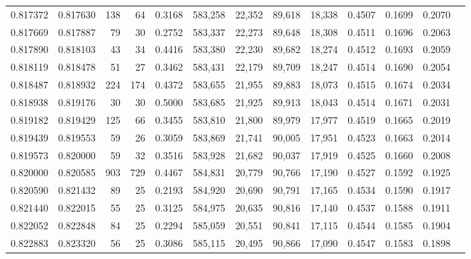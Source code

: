 \begin{tabular}{rrrrrrrrrrrrr}
0.817372 & 0.817630 &   138 &  64 &                                     0.3168 & 583,258 &  22,352 &  89,618 &  18,338 & 0.4507 & 0.1699 & 0.2070 \\
0.817669 & 0.817887 &    79 &  30 &                                     0.2752 & 583,337 &  22,273 &  89,648 &  18,308 & 0.4511 & 0.1696 & 0.2063 \\
0.817890 & 0.818103 &    43 &  34 &                                     0.4416 & 583,380 &  22,230 &  89,682 &  18,274 & 0.4512 & 0.1693 & 0.2059 \\
0.818119 & 0.818478 &    51 &  27 &                                     0.3462 & 583,431 &  22,179 &  89,709 &  18,247 & 0.4514 & 0.1690 & 0.2054 \\
0.818487 & 0.818932 &   224 & 174 &                                     0.4372 & 583,655 &  21,955 &  89,883 &  18,073 & 0.4515 & 0.1674 & 0.2034 \\
0.818938 & 0.819176 &    30 &  30 &                                     0.5000 & 583,685 &  21,925 &  89,913 &  18,043 & 0.4514 & 0.1671 & 0.2031 \\
0.819182 & 0.819429 &   125 &  66 &                                     0.3455 & 583,810 &  21,800 &  89,979 &  17,977 & 0.4519 & 0.1665 & 0.2019 \\
0.819439 & 0.819553 &    59 &  26 &                                     0.3059 & 583,869 &  21,741 &  90,005 &  17,951 & 0.4523 & 0.1663 & 0.2014 \\
0.819573 & 0.820000 &    59 &  32 &                                     0.3516 & 583,928 &  21,682 &  90,037 &  17,919 & 0.4525 & 0.1660 & 0.2008 \\
0.820000 & 0.820585 &   903 & 729 &                                     0.4467 & 584,831 &  20,779 &  90,766 &  17,190 & 0.4527 & 0.1592 & 0.1925 \\
0.820590 & 0.821432 &    89 &  25 &                                     0.2193 & 584,920 &  20,690 &  90,791 &  17,165 & 0.4534 & 0.1590 & 0.1917 \\
0.821440 & 0.822015 &    55 &  25 &                                     0.3125 & 584,975 &  20,635 &  90,816 &  17,140 & 0.4537 & 0.1588 & 0.1911 \\
0.822052 & 0.822848 &    84 &  25 &                                     0.2294 & 585,059 &  20,551 &  90,841 &  17,115 & 0.4544 & 0.1585 & 0.1904 \\
0.822883 & 0.823320 &    56 &  25 &                                     0.3086 & 585,115 &  20,495 &  90,866 &  17,090 & 0.4547 & 0.1583 & 0.1898 \\

\end{tabular}
